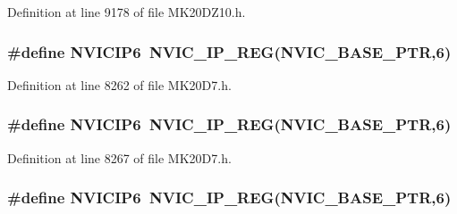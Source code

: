 Definition at line 9178 of file M\+K20\+D\+Z10.\+h.

\subsubsection[{\texorpdfstring{N\+V\+I\+C\+I\+P6}{NVICIP6}}]{\setlength{\rightskip}{0pt plus 5cm}\#define N\+V\+I\+C\+I\+P6~{\bf N\+V\+I\+C\+\_\+\+I\+P\+\_\+\+R\+EG}({\bf N\+V\+I\+C\+\_\+\+B\+A\+S\+E\+\_\+\+P\+TR},6)}\hypertarget{group___n_v_i_c___register___accessor___macros_gab27f26fcb0461e812a41fd6a3b10c1bb}{}\label{group___n_v_i_c___register___accessor___macros_gab27f26fcb0461e812a41fd6a3b10c1bb}


Definition at line 8262 of file M\+K20\+D7.\+h.

\subsubsection[{\texorpdfstring{N\+V\+I\+C\+I\+P6}{NVICIP6}}]{\setlength{\rightskip}{0pt plus 5cm}\#define N\+V\+I\+C\+I\+P6~{\bf N\+V\+I\+C\+\_\+\+I\+P\+\_\+\+R\+EG}({\bf N\+V\+I\+C\+\_\+\+B\+A\+S\+E\+\_\+\+P\+TR},6)}\hypertarget{group___n_v_i_c___register___accessor___macros_gab27f26fcb0461e812a41fd6a3b10c1bb}{}\label{group___n_v_i_c___register___accessor___macros_gab27f26fcb0461e812a41fd6a3b10c1bb}


Definition at line 8267 of file M\+K20\+D7.\+h.

\subsubsection[{\texorpdfstring{N\+V\+I\+C\+I\+P6}{NVICIP6}}]{\setlength{\rightskip}{0pt plus 5cm}\#define N\+V\+I\+C\+I\+P6~{\bf N\+V\+I\+C\+\_\+\+I\+P\+\_\+\+R\+EG}({\bf N\+V\+I\+C\+\_\+\+B\+A\+S\+E\+\_\+\+P\+TR},6)}\hypertarget{group___n_v_i_c___register___accessor___macros_gab27f26fcb0461e812a41fd6a3b10c1bb}{}\label{group___n_v_i_c___register___accessor___macros_gab27f26fcb0461e812a41fd6a3b10c1bb}


